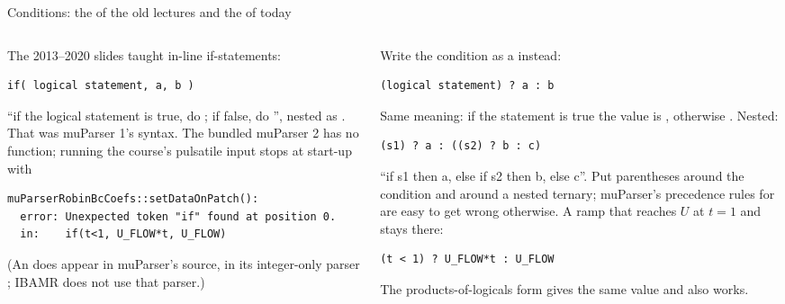 \documentclass[aspectratio=169,11pt]{beamer}
\begin{document}
\begin{frame}[fragile]{Conditions: the  of the old lectures and the  of today}
\label{fr:ternary}
\begin{columns}[T,onlytextwidth]
\begin{column}{0.5\textwidth}
\small The 2013--2020 slides taught in-line if-statements:
\begin{lstlisting}[style=data]
if( logical statement, a, b )
\end{lstlisting}
\small ``if the logical statement is true, do ; if false, do '', nested as . That was muParser 1's syntax. The bundled muParser 2 has no  function; running the course's pulsatile input stops at start-up with
\begin{lstlisting}[style=tiny]
muParserRobinBcCoefs::setDataOnPatch():
  error: Unexpected token "if" found at position 0.
  in:    if(t<1, U_FLOW*t, U_FLOW)
\end{lstlisting}
\small (An  does appear in muParser's source, in its integer-only parser ; IBAMR does not use that parser.)
\end{column}
\begin{column}{0.48\textwidth}
\small Write the condition as a  instead:
\begin{lstlisting}[style=data]
(logical statement) ? a : b
\end{lstlisting}
\small Same meaning: if the statement is true the value is , otherwise . Nested:
\begin{lstlisting}[style=data]
(s1) ? a : ((s2) ? b : c)
\end{lstlisting}
\small ``if s1 then a, else if s2 then b, else c''. Put parentheses around the condition and around a nested ternary; muParser's precedence rules for  are easy to get wrong otherwise.
A ramp that reaches $U$ at $t = 1$ and stays there:
\begin{lstlisting}[style=data]
(t < 1) ? U_FLOW*t : U_FLOW
\end{lstlisting}
\small The products-of-logicals form  gives the same value and also works.
\end{column}
\end{columns}
\end{frame}
\end{document}
